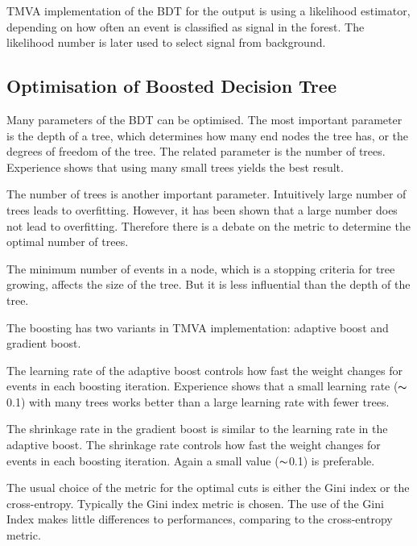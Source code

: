 
TMVA implementation of the BDT for the output is using a likelihood estimator, depending on how often an event is classified as signal in the forest. The likelihood number is later used to select signal from background.

\subsection{Optimisation of Boosted Decision Tree}
\label{sec:pandoraMVAbdtVar}

Many parameters of the BDT can be optimised. The most important parameter is the depth of a tree, which determines how many end nodes the tree has, or the degrees of freedom of the tree. The related parameter is the number of trees. Experience shows that using many small trees yields the best result. 

The number of trees is another important parameter. Intuitively large number of trees leads to overfitting. However, it has been shown that a large number does not lead to overfitting. Therefore there is a debate on the metric to determine the optimal number of trees.

The minimum number of events in a node, which is a stopping criteria for tree growing, affects the size of the tree. But it is less influential than the depth of the tree.

The boosting has two variants in TMVA implementation: adaptive boost and gradient boost.

The learning rate of the adaptive boost  controls how fast the weight changes for events in each boosting iteration. Experience shows that a small learning rate ($\thicksim$0.1) with many trees works better than a large learning rate with fewer trees.

The shrinkage rate in the gradient boost is similar to the learning rate in the adaptive boost. The shrinkage rate controls how fast the weight changes for events in each boosting iteration. Again a small value   ($\thicksim$0.1) is preferable.

The usual choice of the metric for the optimal cuts is either the Gini index or the cross-entropy. Typically the Gini index metric is chosen. The use of the Gini Index  makes little differences to performances, comparing to the cross-entropy metric.

